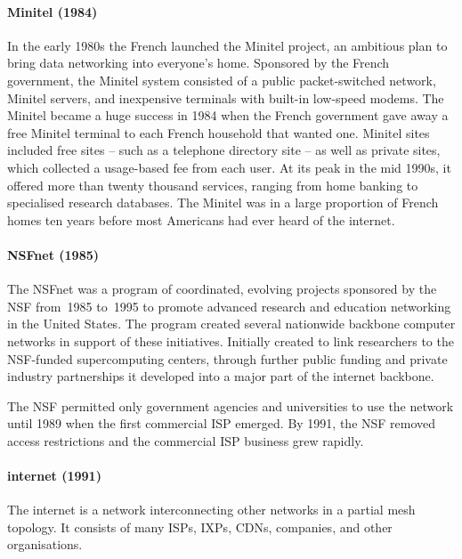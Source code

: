 \paragraph{Minitel (1984)}
In the early 1980s the French launched the Minitel project, an ambitious plan to bring data networking into everyone's home.
Sponsored by the French government, the Minitel system consisted of a public packet-switched network, Minitel servers, and inexpensive terminals with built-in low-speed modems.
The Minitel became a huge success in 1984 when the French government gave away a free Minitel terminal to each French household that wanted one.
Minitel sites included free sites -- such as a telephone directory site -- as well as private sites, which collected a usage-based fee from each user.
At its peak in the mid 1990s, it offered more than twenty thousand services, ranging from home banking to specialised research databases.
The Minitel was in a large proportion of French homes ten years before most Americans had ever heard of the internet.

\paragraph{NSFnet (1985)}%
The NSFnet was a program of coordinated, evolving projects sponsored by the \gls{NSF} from~1985 to~1995 to promote advanced research and education networking in the United States.
The program created several nationwide backbone computer networks in support of these initiatives.
Initially created to link researchers to the \gls{NSF}-funded supercomputing centers, through further public funding and private industry partnerships it developed into a major part of the internet backbone.

The \acl{NSF} permitted only government agencies and universities to use the network until 1989 when the first commercial \acl{ISP} emerged.
By 1991, the \acs{NSF} removed access restrictions and the commercial \acs{ISP} business grew rapidly.

\paragraph{internet (1991)}%
The internet is a network interconnecting other networks in a partial mesh topology.
It consists of many \aclp{ISP}, \glspl{IXP}, \glspl{CDN}, companies, and other organisations.

